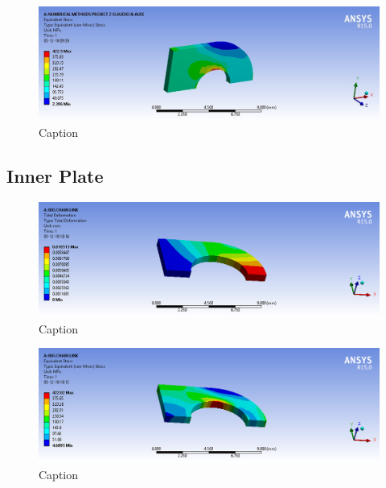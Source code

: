 \documentclass[a4paper 12pt]{article}
\begin{document}
\begin{figure}[!ht]
    \centering
    \includegraphics[width=1\textwidth]{images/CHAIN_SMALL_STRESS_TEST_FINAL.jpg}
    \caption{Caption}
    \label{fig:outer_stress}
\end{figure}


\subsection{Inner Plate}

\begin{figure}[!ht]
    \centering
    \includegraphics[width=1\textwidth]{images/INNER_CHAIN_DEFORMATION.png}
    \caption{Caption}
    \label{fig:inner_deformation}
\end{figure}

\begin{figure}[!ht]
    \centering
    \includegraphics[width=1\textwidth]{images/INNER_CHAIN_STRESS.png}
    \caption{Caption}
    \label{fig:inner_stress}
\end{figure}
\end{document}
